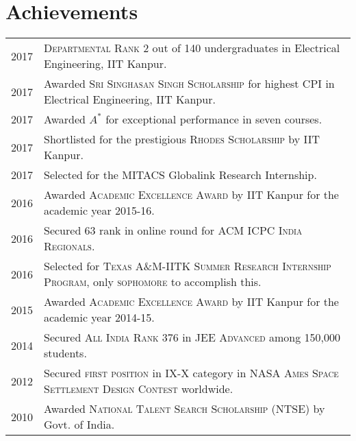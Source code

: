 \documentclass[a4paper,10pt]{article}
\begin{document}
\section{Achievements}
\begin{tabular}{rl}
2017 & \textsc{Departmental Rank 2} out of 140 undergraduates in Electrical
Engineering, IIT Kanpur.\\
2017 & Awarded \textsc{Sri Singhasan Singh Scholarship} for highest CPI in Electrical Engineering, IIT Kanpur.\\
2017 & Awarded $A^*$ for exceptional performance in seven courses.\\
2017 & Shortlisted for the  prestigious \textsc{Rhodes Scholarship} by IIT Kanpur.\\
2017 & Selected for the MITACS Globalink Research Internship. \\
2016 & Awarded \textsc{Academic Excellence Award} by IIT Kanpur for the academic year 2015-16.\\
2016 & Secured 63 rank in online round for \textsc{ACM ICPC India Regionals}.\\
2016 & Selected for \textsc{Texas A\&M-IITK Summer Research Internship Program}, only \textsc{sophomore} to accomplish this.\\
2015 & Awarded \textsc{Academic Excellence Award} by IIT Kanpur for the academic year 2014-15.\\
2014 & Secured \textsc{All India Rank 376} in \textsc{JEE Advanced} among 150,000 students.\\
2012 & Secured \textsc{first position} in IX-X category in \textsc{NASA Ames Space Settlement Design Contest} worldwide.\\
2010 & Awarded \textsc{National Talent Search Scholarship} (NTSE) by Govt. of India.

\end{tabular}
\end{document}
